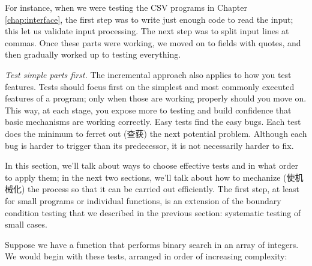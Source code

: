 For instance, when we were testing the CSV programs in Chapter
\ref{chap:interface}, the first step was to write just enough code to read
the input; this let us validate input processing.  The next step was to
split input lines at commas. Once these parts were working, we moved on to
fields with quotes, and then gradually worked up to testing everything.

\emph{Test simple parts first.} The incremental approach also applies to
how you test features. Tests should focus first on the simplest and most
commonly executed features of a program; only when those are working
properly should you move on. This way, at each stage, you expose more to
testing and build confidence that basic mechanisms are working correctly.
Easy tests find the easy bugs. Each test does the minimum to ferret out
(查获) the next potential problem. Although each bug is harder to trigger
than its predecessor, it is not necessarily harder to fix.

In this section, we'll talk about ways to choose effective tests and in
what order to apply them; in the next two sections, we'll talk about how to
mechanize (使机械化) the process so that it can be carried out efficiently.
The first step, at least for small programs or individual functions, is an
extension of the boundary condition testing that we described in the
previous section: systematic testing of small cases.

Suppose we have a function that performs binary search in an array of
integers.  We would begin with these tests, arranged in order of increasing
complexity:

